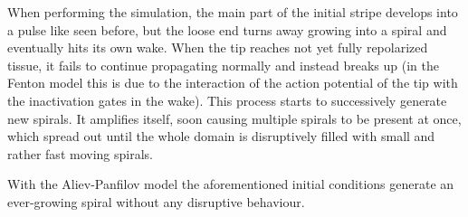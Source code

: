 When performing the simulation, the main part of the initial stripe develops
into a pulse like seen before, but the loose end turns away growing into a
spiral and eventually hits its own wake. When the tip reaches not yet fully
repolarized tissue, it fails to continue propagating normally and instead
breaks up (in the Fenton model this is due to the interaction of the action
potential of the tip with the inactivation gates in the wake). This process
starts to successively generate new spirals. It amplifies itself, soon causing
multiple spirals to be present at once, which spread out until the whole domain
is disruptively filled with small and rather fast moving spirals.


With the Aliev-Panfilov model the aforementioned initial conditions generate
an ever-growing spiral without any disruptive behaviour.


